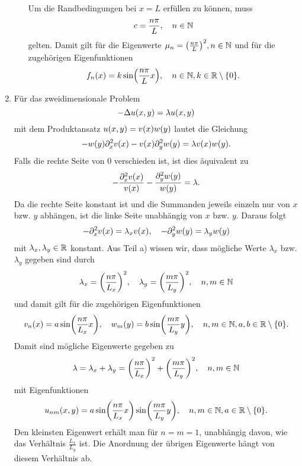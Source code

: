 \documentclass{exercise}
\begin{document}
\begin{enumerate}
\begin{itemize}
            Um die Randbedingungen bei \(x = L\) erfüllen zu können, muss
            \[
                c = \frac{n\pi}{L}, \quad n \in \mathbb{N}
            \]
            gelten.
            Damit gilt für die Eigenwerte \(\mu_n = \parentheses*{\frac{n\pi}{L}}^2, n \in \N\) und für die zugehörigen Eigenfunktionen
            \[
                f_n\parentheses*{x} = k\sin\parentheses*{\frac{n\pi}{L}x}, \quad n \in \N, k \in \R \setminus \braces*{0}.
            \]
        \end{itemize}
        \item Für das zweidimensionale Problem
        \[
            -\Delta u\parentheses*{x, y} = \lambda u\parentheses*{x, y}
        \]
        mit dem Produktansatz \(u\parentheses*{x, y} = v\parentheses*{x}w\parentheses*{y}\) lautet die Gleichung
        \[
            -w\parentheses*{y}\partial_x^2 v\parentheses*{x} - v\parentheses*{x}\partial_y^2 w\parentheses*{y} = \lambda v\parentheses*{x}w\parentheses*{y}.
        \]
        Falls die rechte Seite von \(0\) verschieden ist, ist dies äquivalent zu
        \[
            -\frac{\partial_x^2 v\parentheses*{x}}{v\parentheses*{x}} - \frac{\partial_y^2 w\parentheses*{y}}{w\parentheses*{y}} = \lambda.
        \]
        Da die rechte Seite konstant ist und die Summanden jeweils einzeln nur von \(x\) bzw. \(y\) abhängen, ist die linke Seite unabhängig von \(x\) bzw. \(y\).
        Daraus folgt
        \[
            -\partial_x^2 v\parentheses*{x} = \lambda_x v\parentheses*{x}, \quad -\partial_y^2 w\parentheses*{y} = \lambda_y w\parentheses*{y}
        \]
        mit \(\lambda_x, \lambda_y \in \mathbb{R}\) konstant.
        Aus Teil a) wissen wir, dass mögliche Werte \(\lambda_x\) bzw. \(\lambda_y\) gegeben sind durch
        \[
            \lambda_x = \parentheses*{\frac{n\pi}{L_x}}^2, \quad \lambda_y = \parentheses*{\frac{m\pi}{L_y}}^2, \quad n, m \in \N
        \]
        und damit gilt für die zugehörigen Eigenfunktionen
        \[
            v_n\parentheses*{x} = a\sin\parentheses*{\frac{n\pi}{L_x}x}, \quad w_m\parentheses*{y} = b\sin\parentheses*{\frac{m\pi}{L_y}y}, \quad n, m \in \N, a, b \in \R \setminus \braces*{0}.
        \]
        Damit sind mögliche Eigenwerte gegeben zu
        \[
            \lambda = \lambda_x + \lambda_y = \parentheses*{\frac{n\pi}{L_x}}^2 + \parentheses*{\frac{m\pi}{L_y}}^2, \quad n, m \in \N
        \]
        mit Eigenfunktionen
        \[
            u_{nm}\parentheses*{x, y} = a\sin\parentheses*{\frac{n\pi}{L_x}x}\sin\parentheses*{\frac{m\pi}{L_y}y}, \quad n, m \in \N, a \in \R \setminus \braces*{0}.
        \]
        Den kleinsten Eigenwert erhält man für \(n = m = 1\), unabhängig davon, wie das Verhältnis \(\frac{L_x}{L_y}\) ist.
        Die Anordnung der übrigen Eigenwerte hängt von diesem Verhältnis ab.
    \end{enumerate}
\end{document}
